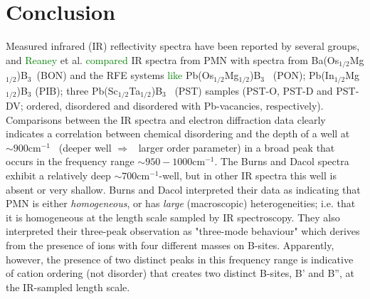 \documentclass[twocolumn]{revtex4}
\newcommand{\chg}[1]{\textcolor{green}{#1}}
\begin{document}
\section{Conclusion}
Measured infrared (IR) reflectivity spectra have been reported by several groups, and
\chg{Reaney} et al. \chg{compared} IR spectra from PMN with spectra from
Ba(Os$_{1/2}$Mg$_{1/2}$)B$_{3}$~(BON) and the RFE systems \chg{like}
Pb(Os$_{1/2}$Mg$_{1/2}$)B$_{3}$~ (PON); Pb(In$_{1/2}$Mg$_{1/2}$)B$_{3}$ (PIB); three
Pb(Sc$_{1/2}$Ta$_{1/2}$)B$_{3}$~ (PST) samples (PST-O, PST-D and PST-DV; ordered,
disordered and disordered with Pb-vacancies, respectively). Comparisons between the IR
spectra and electron diffraction data clearly indicates a correlation between chemical
disordering and the depth of a well at $\sim 900 \mathrm{cm}^{-1}$~ (deeper well
$\Rightarrow$~ larger order parameter) in a broad peak that occurs in the frequency
range $\sim 950-1000\mathrm{cm}^{-1}$. The Burns and Dacol spectra exhibit a relatively
deep $\sim 700\mathrm{cm}^{-1}$-well, but in other IR spectra
 this well is absent or very shallow. Burns and Dacol
 interpreted their data as indicating that PMN is either \emph{homogeneous},
or has \emph{large} (macroscopic) heterogeneities; i.e. that it is homogeneous at the
length scale sampled by IR spectroscopy. They also interpreted their three-peak
observation as "three-mode behaviour" which derives from the presence of ions with four
different masses on B-sites. Apparently, however, the presence of two distinct peaks in
this frequency range is indicative of cation ordering (not disorder) that creates two
distinct B-sites, B' and B'', at the IR-sampled length scale.
\end{document}
